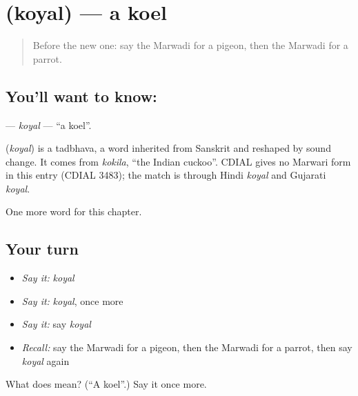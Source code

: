 \section[\texorpdfstring{\mw{कोयल} (koyal)}{कोयल (koyal)}]{ (koyal) — a koel}

\label{lesson:MW-C139-koyal}



\begin{quote}
Before the new one: say the Marwadi for a pigeon, then the Marwadi for a parrot.
\end{quote}

\subsection*{You'll want to know: }
\textbf{} — \emph{koyal} — \textquotedblleft{}a koel\textquotedblright{}.

\begin{cousinweb}
\textbf{} (\emph{koyal}) is a tadbhava, a word inherited from Sanskrit and reshaped by sound change. It comes from \emph{kokila}, \textquotedblleft{}the Indian cuckoo\textquotedblright{}. CDIAL gives no Marwari form in this entry (CDIAL 3483); the match is through Hindi \emph{koyal} and Gujarati \emph{koyal}.
\end{cousinweb}

\begin{grammarlens}[title={What you've built}]
One more word for this chapter.
\end{grammarlens}

\subsection*{Your turn}
\begin{itemize}
\raggedright
  \item \emph{Say it:} \emph{koyal}
  \item \emph{Say it:} \emph{koyal}, once more
  \item \emph{Say it:} say \emph{koyal}
  \item \emph{Recall:} say the Marwadi for a pigeon, then the Marwadi for a parrot, then say \emph{koyal} again
\end{itemize}

\begin{tcolorbox}[breakable,colback=teal!4,colframe=teal!35!black,title={Before you move on}]
What does  mean? (\textquotedblleft{}A koel\textquotedblright{}.) Say it once more.
\end{tcolorbox}
